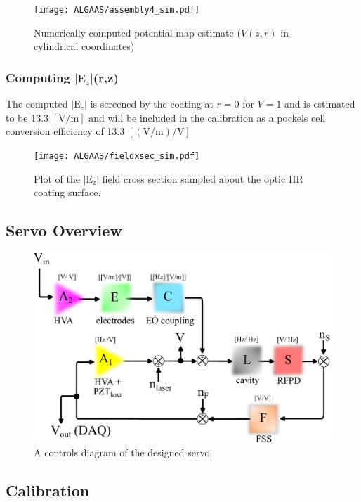 \begin{figure}[H]
  \texttt{[image: ALGAAS/assembly4\_sim.pdf]}
  \caption{Numerically computed potential map estimate ($V(z,r)$ in cylindrical coordinates)}
  \label{fig:poissoncalcoutput}
\end{figure}


\subsubsection*{Computing $|\mathrm{E}_z|$(r,z)}

The computed $|\mathrm{E}_z|$ is screened by the coating at $r = 0$ for $V = 1$ and is estimated to be 13.3 $[\mathrm{V}/\mathrm{m}]$ and will be included in the calibration as a pockels cell conversion efficiency of 13.3 $[(\mathrm{V} / \mathrm{m}) / \mathrm{V}]$  

\begin{figure}[H]
    \texttt{[image: ALGAAS/fieldxsec\_sim.pdf]}
    \caption{Plot of the $| \mathrm{E}_\mathrm{z} |$ field cross section sampled about the optic HR coating surface.}
\label{fig:Ez}
\end{figure}

\iffalse
\subsection{Servo Overview}
\begin{figure}[!ht]
	\includegraphics[width=\textwidth]{figs/ALGAAS/pock_control_diagram.pdf}
	\caption{A controls diagram of the designed servo.}
	\label{fig:pock_control_servo}
\end{figure}

\subsection{Calibration}



